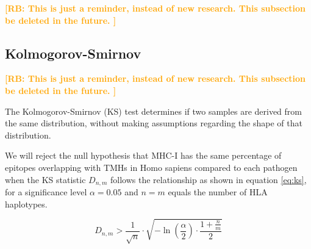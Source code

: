 \documentclass{article}
\newcommand{\richel}[1]{\textcolor{orange}{\textbf{[RB: #1]}}}
\begin{document}
\richel{
  This is just a reminder, instead of new research. 
  This subsection be deleted in the future.
}

\begin{table}
  
  \caption{
    Percentage of MHC-II haplotypes, from \cite{greenbaum2011functional}
    \richel{
      This is just a reminder, instead of new research. 
      This table be deleted in the future.
    }
  }
  \label{table:bbbq_2_percentages}
\end{table}

\subsection{Kolmogorov-Smirnov}

\richel{
  This is just a reminder, instead of new research. 
  This subsection be deleted in the future.
}

The Kolmogorov-Smirnov (KS) test determines if two samples
are derived from the same distribution, without making assumptions
regarding the shape of that distribution. 

We will reject
the null hypothesis that MHC-I has the same percentage of epitopes 
overlapping with TMHs in Homo sapiens compared to each pathogen when 
the KS statistic $D_{n,m}$ follows the relationship as shown in 
equation \ref{eq:ks}, for a significance level $\alpha = 0.05$
and $n = m$ equals the number of HLA haplotypes.

\begin{equation}
   D_{n,m} > \frac{1}{\sqrt{n}} \cdot \sqrt{ -\ln(\frac{\alpha}{2}) \cdot \frac{1 + \frac{n}{m}}{2} }
   \label{eq:ks}
\end{equation}
\end{document}
